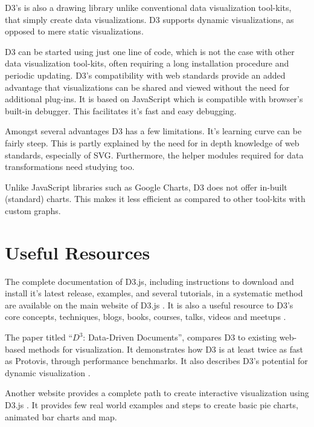 \documentclass[9pt,twocolumn,twoside]{styles/osajnl}
\begin{document}
D3's is also a drawing library unlike conventional data visualization tool-kits, that simply create data visualizations. D3 supports dynamic visualizations, as opposed to mere static visualizations. 

D3 can be started using just one line of code, which is not the case with other data visualization tool-kits, often requiring a long installation procedure and periodic updating. D3's compatibility with web standards provide an added advantage that visualizations can be shared and viewed without the need for additional plug-ins. It is based on JavaScript which is compatible with browser’s built-in debugger. This facilitates it's fast and easy debugging.

Amongst several advantages D3 has a few limitations. It's  learning curve can be fairly steep. This is partly explained by the need for in depth knowledge of web standards, especially of SVG. Furthermore, the helper modules required for data transformations need studying too. 

Unlike JavaScript libraries such as Google Charts, D3 does not offer in-built (standard) charts. This makes it less efficient as compared to other tool-kits with custom graphs.

\section{Useful Resources}
The complete documentation of D3.js, including instructions to download and install it's latest release, examples, and several tutorials, in a systematic method are available on the main website of D3.js \cite{www-d3}. It is also a useful resource to D3's core concepts, techniques, blogs, books, courses, talks, videos and meetups \cite{www-tut}. 

The paper titled “$D^3$: Data-Driven Documents”, compares D3 to existing web-based methods for visualization. It demonstrates how D3 is at least twice as fast as Protovis, through performance benchmarks. It also describes D3’s potential for dynamic visualization \cite{paper-d3}.

Another website provides a complete path to create interactive visualization using D3.js \cite{www-av}. It provides few real world examples and steps to create basic pie charts, animated bar charts and map.
\end{document}
